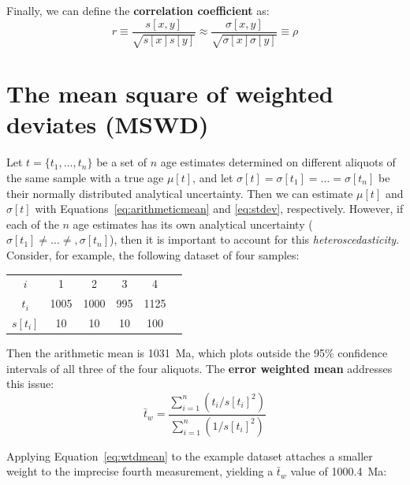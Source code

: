 \begin{refsection}
Finally, we can define the \textbf{correlation coefficient} as:
\begin{equation}
  r \equiv \frac{s[x,y]}{\sqrt{s[x]s[y]}} 
  \approx 
  \frac{\sigma[x,y]}{\sqrt{\sigma[x]\sigma[y]}}
  \equiv \rho
  \label{eq:rho}
\end{equation}

\section{The mean square of weighted deviates (MSWD)}
\label{sec:mswd}

Let $t = \{t_1, \ldots, t_n\}$ be a set of $n$ age estimates
determined on different aliquots of the same sample with a true age
$\mu[t]$, and let $\sigma[t] = \sigma[t_1] = \ldots = \sigma[t_n]$ be
their normally distributed analytical uncertainty. Then we can
estimate $\mu[t]$ and $\sigma[t]$ with
Equations~\ref{eq:arithmeticmean} and \ref{eq:stdev}, respectively.
However, if each of the $n$ age estimates has its own analytical
uncertainty ($\sigma[t_1] \neq \ldots \neq, \sigma[t_n]$), then it is
important to account for this \textit{heteroscedasticity}. Consider,
for example, the following dataset of four samples:

\begin{center}
\begin{tabular}{c|ccccc}
  $i$ & 1 & 2 & 3 & 4 \\
$t_i$ & 1005 & 1000 & 995 & 1125 \\
$s[t_i]$ & 10 & 10 & 10 & 100
\end{tabular}
\label{tab:wtdmean}
\end{center}

Then the arithmetic mean is 1031~Ma, which plots outside the 95\%
confidence intervals of all three of the four aliquots. The
\textbf{error weighted mean} addresses this issue:
\begin{equation}
  \bar{t}_w = \frac{\sum_{i=1}^n (t_i/s[t_i]^2) }{\sum_{i=1}^n (1/s[t_i]^2) }
  \label{eq:wtdmean}
\end{equation}

Applying Equation~\ref{eq:wtdmean} to the example dataset attaches a
smaller weight to the imprecise fourth measurement, yielding a
$\bar{t}_w$ value of 1000.4~Ma:


\end{refsection}
